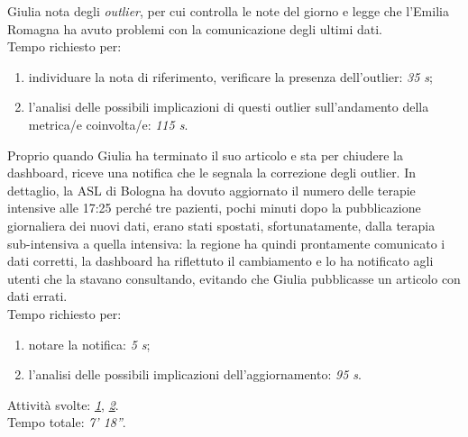 \noindent
Giulia nota degli \textit{outlier}, per cui controlla le note del giorno e legge che l'Emilia Romagna ha avuto problemi con la comunicazione degli ultimi dati.\\
Tempo richiesto per:
\begin{enumerate}
    \item individuare la nota di riferimento, verificare la presenza dell'outlier: \textit{35 s};
    \item l'analisi delle possibili implicazioni di questi outlier sull'andamento della metrica/e coinvolta/e: \textit{115 s}.
\end{enumerate}

\noindent
Proprio quando Giulia ha terminato il suo articolo e sta per chiudere la dashboard, riceve una notifica che le segnala la correzione degli outlier. In dettaglio, la ASL di Bologna ha dovuto aggiornato il numero delle terapie intensive alle 17:25 perché tre pazienti, pochi minuti dopo la pubblicazione giornaliera dei nuovi dati, erano stati spostati, sfortunatamente, dalla terapia sub-intensiva a quella intensiva: la regione ha quindi prontamente comunicato i dati corretti, la dashboard ha riflettuto il cambiamento e lo ha notificato agli utenti che la stavano consultando, evitando che Giulia pubblicasse un articolo con dati errati.\\
Tempo richiesto per:
\begin{enumerate}
    \item notare la notifica: \textit{5 s};
    \item l'analisi delle possibili implicazioni dell'aggiornamento: \textit{95 s}.
\end{enumerate}

\noindent
Attività svolte: \hyperref[itm:1]{\textit{1}}, \hyperref[itm:2]{\textit{2}}.\\  
Tempo totale: \textit{7' 18''}. 